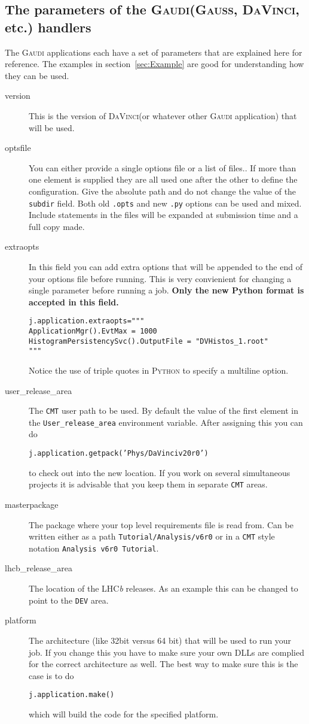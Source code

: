 \documentclass{howto}
\def\python {\textsc{Python}\xspace}
\def\lhcb {LHC{\em b\/}\xspace}
\def\gaudi {\textsc{Gaudi}\xspace}
\def\davinci {\textsc{DaVinci}\xspace}
\def\gauss {\textsc{Gauss}\xspace}
\def\davinciv {v20r0\xspace}
\begin{document}
\subsection{The parameters of the \gaudi (\gauss, \davinci, etc.) handlers}
\label{sec:GaudiParameters}
The \gaudi applications each have a set of parameters that are explained here
for reference. The examples in section~\ref{sec:Example} are good for
understanding how they can be used.
\begin{description}
\item[version] This is the version of \davinci (or whatever other \gaudi
  application) that will be used.
\item[optsfile] You can either provide a single options file or a list of
  files.. If more than one element is supplied they are all used one after the
  other to define the configuration. Give the absolute path and do not change
  the value of the \texttt{subdir} field. Both old \texttt{.opts} and new
  \texttt{.py} options can be used and mixed. Include statements in the files
  will be expanded at submission time and a full copy made.
\item[extraopts] In this field you can add extra options that will be appended
  to the end of your options file before running. This is very convienient for
  changing a single parameter before running a job. \textbf{Only the new
    Python format is accepted in this field.}
\begin{verbatim}
j.application.extraopts="""
ApplicationMgr().EvtMax = 1000
HistogramPersistencySvc().OutputFile = "DVHistos_1.root"
"""
\end{verbatim}
  Notice the use of triple quotes in \python to specify a multiline option.
\item[user_release_area] The \texttt{CMT} user path to be used. By default the
  value of the first element in the \texttt{User_release_area} environment
  variable. After assigning this you can do
\begin{alltt}
j.application.getpack('Phys/DaVinci \davinciv') 
\end{alltt}
  to check out into the new location. If you work on several simultaneous
  projects it is advisable that you keep them in separate \texttt{CMT} areas.
\item[masterpackage] The package where your top level requirements file is
  read from. Can be written either as a path \texttt{Tutorial/Analysis/v6r0}
  or in a \texttt{CMT} style notation \texttt{Analysis v6r0 Tutorial}.
\item[lhcb_release_area] The location of the \lhcb releases. As an example
  this can be changed to point to the \texttt{DEV} area.
\item[platform] The architecture (like 32bit versus 64 bit) that will be used
  to run your job. If you change this you have to make sure your own DLLs are
  complied for the correct architecture as well. The best way to make sure
  this is the case is to do
\begin{verbatim}
j.application.make()
\end{verbatim}
  which will build the code for the specified platform.
\end{description}
\end{document}
